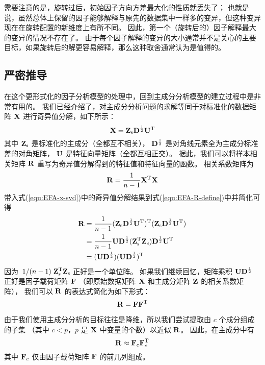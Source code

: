 需要注意的是，旋转过后，初始因子方向方差最大化的性质就丢失了；
也就是说，虽然总体上保留的因子能够解释与原先的数据集中一样多的变异，但这种变异现在在旋转配置的新维度上有所不同。
因此，第一个（旋转后的）因子解释最大的变异的情况不存在了。
由于每个因子解释的变异的大小通常并不是关心的主要目标，如果旋转后的解更容易解释，那么这种取舍通常认为是值得的。

\subsection{严密推导}\label{sec:EFA-Mechanics}

在这个更形式化的因子分析模型的处理中，回到主成分分析模型的建立过程中是非常有用的。
我们已经介绍了，对主成分分析问题的求解等同于对标准化的数据矩阵 $ \mathbf{X} $ 进行奇异值分解，如下所示：
\begin{equation}\label{equ:EFA-x-svd}
    \mathbf{X} = \mathbf{Z}_{\mathrm{s}} \mathbf{D}^{\frac{1}{2}}\mathbf{U}^\mathrm{T}
\end{equation}
其中 $ \mathbf{Z}_{\mathrm{s}} $ 是标准化的主成分（全都互不相关），
$ \mathbf{D}^{\frac{1}{2}} $ 是对角线元素全为主成分标准差的对角矩阵，
$ \mathbf{U} $ 是特征向量矩阵（全都互相正交）。
据此，我们可以将样本相关矩阵 $ \mathbf{R} $ 重写为奇异值分解得到的特征值和特征向量的函数。
相关系数矩阵为
\begin{equation}\label{equ:EFA-R-define}
    \mathbf{R} = \frac{1}{n-1} \mathbf{X}^\mathrm{T} \mathbf{X}
\end{equation}
带入式(\ref{equ:EFA-x-svd})中的奇异值分解结果到式(\ref{equ:EFA-R-define})中并简化可得
\begin{align}
    \begin{split}
        \mathbf{R} & = \frac{1}{n-1}(\mathbf{Z}_{\mathrm{s}} \mathbf{D}^{\frac{1}{2}}\mathbf{U}^\mathrm{T})^\mathrm{T}(\mathbf{Z}_{\mathrm{s}} \mathbf{D}^{\frac{1}{2}}\mathbf{U}^\mathrm{T}) \\ 
        & = \frac{1}{n-1}\mathbf{U}\mathbf{D}^{\frac{1}{2}}(\mathbf{Z}_{\mathrm{s}}^\mathrm{T}\mathbf{Z}_{\mathrm{s}})\mathbf{D}^{\frac{1}{2}}\mathbf{U}^\mathrm{T} \\
        & = (\mathbf{U}\mathbf{D}^{\frac{1}{2}})(\mathbf{U}\mathbf{D}^{\frac{1}{2}})^\mathrm{T}
    \end{split}
\end{align}
因为 $ \left. {1} \middle/ {(n-1)} \right.\mathbf{Z}_{\mathrm{s}}^\mathrm{T}\mathbf{Z}_{\mathrm{s}} $ 正好是一个单位阵。
如果我们继续回忆，矩阵乘积 $ \mathbf{U}\mathbf{D}^{\frac{1}{2}} $ 正好是因子载荷矩阵 $ \mathbf{F} $
（即原始数据矩阵 $ \mathbf{X} $ 和主成分矩阵 $ \mathbf{Z} $ 的相关系数矩阵），
我们可以 $ \mathbf{R} $ 的表达式简化为如下形式：
\begin{equation}
    \mathbf{R} = \mathbf{F}\mathbf{F}^\mathrm{T}
\end{equation}

由于我们使用主成分分析的目标往往是降维，所以我们尝试提取由 $ c $ 个成分组成的子集
（其中 $ c < p $，$ p $ 是 $ \mathbf{X} $ 中变量的个数）以近似 $ \mathbf{R} $。
因此，在主成分中有
\begin{equation}\label{equ:EFA-R-pca}
    \mathbf{R} \approx \mathbf{F}_c\mathbf{F}_c^\mathrm{T}
\end{equation}
其中 $ \mathbf{F}_c $ 仅由因子载荷矩阵 $ \mathbf{F} $ 的前几列组成。

